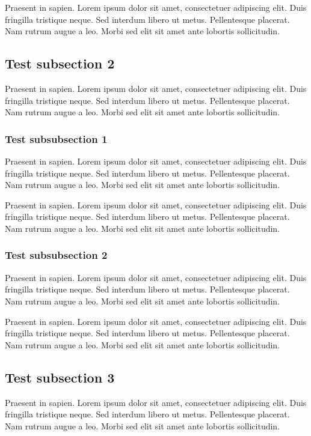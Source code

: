 \documentclass[a5paper,12pt,draft]{book} %
\begin{document}
Praesent in sapien. Lorem ipsum dolor sit amet, consectetuer adipiscing elit.
Duis fringilla tristique neque. Sed interdum libero ut metus. Pellentesque placerat.
Nam rutrum augue a leo. Morbi sed elit sit amet ante lobortis sollicitudin.

\subsection*{Test subsection 2}
Praesent in sapien. Lorem ipsum dolor sit amet, consectetuer adipiscing elit.
Duis fringilla tristique neque. Sed interdum libero ut metus. Pellentesque placerat.
Nam rutrum augue a leo. Morbi sed elit sit amet ante lobortis sollicitudin.

\subsubsection*{Test subsubsection 1}
Praesent in sapien. Lorem ipsum dolor sit amet, consectetuer adipiscing elit.
Duis fringilla tristique neque. Sed interdum libero ut metus. Pellentesque placerat.
Nam rutrum augue a leo. Morbi sed elit sit amet ante lobortis sollicitudin.

Praesent in sapien. Lorem ipsum dolor sit amet, consectetuer adipiscing elit.
Duis fringilla tristique neque. Sed interdum libero ut metus. Pellentesque placerat.
Nam rutrum augue a leo. Morbi sed elit sit amet ante lobortis sollicitudin.

\subsubsection*{Test subsubsection 2}
Praesent in sapien. Lorem ipsum dolor sit amet, consectetuer adipiscing elit.
Duis fringilla tristique neque. Sed interdum libero ut metus. Pellentesque placerat.
Nam rutrum augue a leo. Morbi sed elit sit amet ante lobortis sollicitudin.

Praesent in sapien. Lorem ipsum dolor sit amet, consectetuer adipiscing elit.
Duis fringilla tristique neque. Sed interdum libero ut metus. Pellentesque placerat.
Nam rutrum augue a leo. Morbi sed elit sit amet ante lobortis sollicitudin.

\subsection*{Test subsection 3}
Praesent in sapien. Lorem ipsum dolor sit amet, consectetuer adipiscing elit.
Duis fringilla tristique neque. Sed interdum libero ut metus. Pellentesque placerat.
Nam rutrum augue a leo. Morbi sed elit sit amet ante lobortis sollicitudin.
\end{document}
